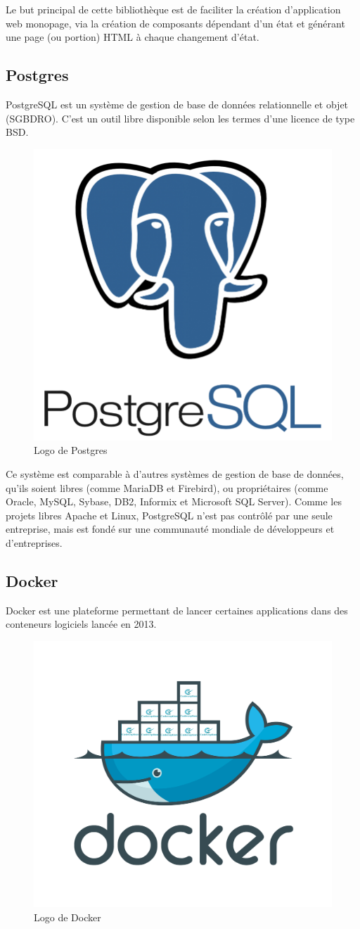 \noindent Le but principal de cette bibliothèque est de faciliter la création d'application web monopage, via la création de composants dépendant d'un état et générant une page (ou portion) HTML à chaque changement d'état. 

\clearpage


\subsection{Postgres}

\noindent PostgreSQL est un système de gestion de base de données relationnelle et objet (SGBDRO). C'est un outil libre disponible selon les termes d'une licence de type BSD.

\begin{figure}[H]
    \centering
    \includegraphics[width=.25\textwidth]{logos/postgres.png}
    \caption{Logo de Postgres}
\end{figure}

\noindent Ce système est comparable à d'autres systèmes de gestion de base de données, qu'ils soient libres (comme MariaDB et Firebird), ou propriétaires (comme Oracle, MySQL, Sybase, DB2, Informix et Microsoft SQL Server). Comme les projets libres Apache et Linux, PostgreSQL n'est pas contrôlé par une seule entreprise, mais est fondé sur une communauté mondiale de développeurs et d'entreprises. 


\subsection{Docker}

\noindent Docker est une plateforme permettant de lancer certaines applications dans des conteneurs logiciels lancée en 2013. 

\begin{figure}[H]
    \centering
    \includegraphics[width=.3\textwidth]{logos/docker.png}
    \caption{Logo de Docker}
\end{figure}

